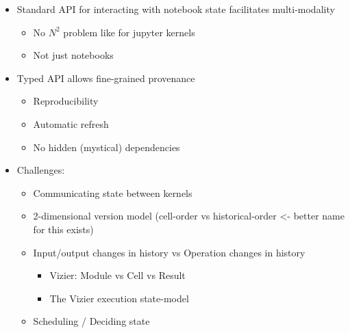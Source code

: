 \begin{itemize}
	\item Standard API for interacting with notebook state facilitates multi-modality
	\begin{itemize}
		\item No $N^2$ problem like for jupyter kernels
		\item Not just notebooks
	\end{itemize}
	\item Typed API allows fine-grained provenance
	\begin{itemize}
		\item Reproducibility
		\item Automatic refresh
		\item No hidden (mystical) dependencies
	\end{itemize}
	\item Challenges:
	\begin{itemize}
		\item Communicating state between kernels
		\item 2-dimensional version model (cell-order vs historical-order <- better name for this exists)
		\item Input/output changes in history vs Operation changes in history
		\begin{itemize}
			\item Vizier: Module vs Cell vs Result
			\item The Vizier execution state-model
		\end{itemize}
		\item Scheduling / Deciding state
	\end{itemize}
\end{itemize}


